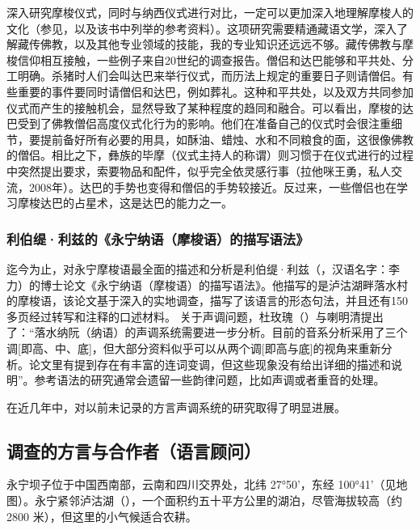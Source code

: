 深入研究摩梭仪式，同时与纳西仪式进行对比，一定可以更加深入地理解摩梭人的文化（参见\textcite{mathieu2015}，以及该书中列举的参考资料）。这项研究需要精通{藏语}文学，深入了解{藏}传佛教，以及其他专业领域的技能，我的专业知识还远远不够。{藏}传佛教与摩梭信仰相互接触，一些例子来自20世纪的调查报告。僧侣和{达巴}能够和平共处、分工明确。杀猪时人们会叫{达巴}来举行仪式，而历法上规定的重要日子则请僧侣。有些重要的事件要同时请僧侣和{达巴}，例如葬礼。这种和平共处，以及双方共同参加仪式而产生的接触机会，显然导致了某种程度的趋同和融合。可以看出，摩梭的{达巴}受到了佛教僧侣高度仪式化行为的影响。他们在准备自己的仪式时会很注重细节，要提前备好所有必要的用具，如酥油、蜡烛、水和不同粮食的面，这很像佛教的僧侣。相比之下，{彝}族的毕摩（仪式主持人的称谓）则习惯于在仪式进行的过程中突然提出要求，索要物品和配件，似乎完全依灵感行事（拉他咪王勇，私人交流，2008年）。{达巴}的手势也变得和僧侣的手势较接近。反过来，一些僧侣也在学习摩梭达巴的占星术，这是达巴的能力之一。


\subsubsection{利伯缇·利兹的《{永宁纳}语（摩梭语）的描写语法》\parencite{lidz2010}}
\label{sec:lidz2010}
迄今为止，对永宁摩梭语最全面的描述和分析是利伯缇·利兹（，汉语名字：李力）的博士论文\parencite{lidz2010}《{永宁纳}语（摩梭语）的描写语法》。他描写的是泸沽湖畔落水村的摩梭语，该论文基于深入的实地调查，描写了该语言的形态句法，并且还有150多页经过转写和注释的口述材料。
关于声调问题，杜玫瑰（）与喇明清提出了：“落水纳阮（纳语）的声调系统需要进一步分析。目前的音系分析采用了三个调[即高、中、底]，但大部分资料似乎可以从两个调[即高与底]的视角来重新分析。论文里有提到{存在}有丰富的连词变调，但这些现象没有给出详细的描述和说明”\parencite{dobbsetal2016}。参考语法的研究通常会遗留一些韵律问题，比如声调或者重音的处理\parencite[26]{zeitoun2007}。

在近几年中，对以前未记录的方言声调系统的研究取得了明显进展\parencite{a2016,dobbsetal2016,fily_documentation_2022}。

\subsection{调查的方言与合作者（语言顾问）}

永宁坝子位于中国西南部，云南和四川交界处，北纬 27°50'，东经 100°41'（见地图）。永宁紧邻泸沽湖（），一个面积约五十平方公里的湖泊，尽管海拔较高（约 2800 米），但这里的小气候适合农耕。

